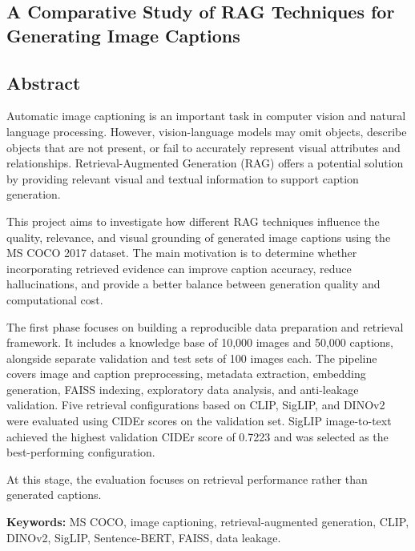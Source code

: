 \documentclass{article}
\begin{document}
\subsection*{A Comparative Study of RAG Techniques for Generating Image Captions}
\label{a-comparative-study-of-rag-techniques-for-generating-image-captions}

\subsection*{Abstract}



Automatic image captioning is an important task in computer vision and natural language processing. However, vision-language models may omit objects, describe objects that are not present, or fail to accurately represent visual attributes and relationships. Retrieval-Augmented Generation (RAG) offers a potential solution by providing relevant visual and textual information to support caption generation.

This project aims to investigate how different RAG techniques influence the quality, relevance, and visual grounding of generated image captions using the MS COCO 2017 dataset. The main motivation is to determine whether incorporating retrieved evidence can improve caption accuracy, reduce hallucinations, and provide a better balance between generation quality and computational cost.

The first phase focuses on building a reproducible data preparation and retrieval framework. It includes a knowledge base of 10,000 images and 50,000 captions, alongside separate validation and test sets of 100 images each. The pipeline covers image and caption preprocessing, metadata extraction, embedding generation, FAISS indexing, exploratory data analysis, and anti-leakage validation. Five retrieval configurations based on CLIP, SigLIP, and DINOv2 were evaluated using CIDEr scores on the validation set. SigLIP image-to-text achieved the highest validation CIDEr score of 0.7223 and was selected as the best-performing configuration.

At this stage, the evaluation focuses on retrieval performance rather than generated captions.

\textbf{Keywords:} MS COCO, image captioning, retrieval-augmented
generation, CLIP, DINOv2, SigLIP, Sentence-BERT, FAISS, data leakage.



\newpage
\end{document}
